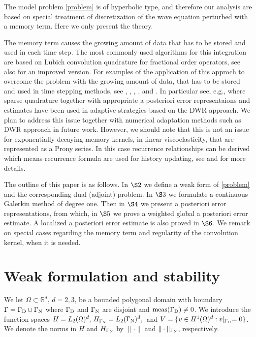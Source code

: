 \documentclass{amsart}
\numberwithin{equation}{section}
\theoremstyle{definition}
\begin{document}
The model problem \eqref{problem} is of hyperbolic type, and therefore 
our analysis are based on special treatment of discretization of the 
wave equation perturbed with a memory term. 
Here we only present the theory.

The memory term causes the growing amount 
of data that has to be stored and used in each time step. 
The most commonly used algorithms for this
integration are based on Lubich convolution quadrature \cite{Lubich} 
for fractional order
operators, see also \cite{LopezLubichSchadle} for an improved version. 
For examples of the application of this approch to overcome the problem 
with the growing amount of data, that has to be stored and used in time stepping 
methods, see \cite{Stig2}, \cite{Stig3}, \cite{Stig4}, \cite{LubichSloanThomee}, 
and \cite{McLeanThomeeWahlbin}. 
In particular see, e.g., \cite{Stig2} where sparse quadrature together with 
appropriate a posteriori error representaions and estimates have been 
used in adaptive strategies based on the DWR approach. 
We plan to address this issue together with numerical adaptation 
methods such as DWR approach in future work.  
However, we should note that this is not an issue for exponentially decaying 
memory kernels, in linear viscoelasticity, that are represented as a Prony series.  
In this case recurrence relationships can be derived which means recurrence formula 
are used for history updating, see \cite{KaramanouShawWarbyWhiteman2005} 
and \cite{ShawWhiteman} for more details. 

The outline of this paper is as follows. In $\S2$ we define
a weak form of \eqref{problem} and the corresponding
dual (adjoint) problem. 
In $\S3$ we formulate a continuous Galerkin method of degree 
one. 
Then in $\S4$ we present a posteriori error representations, from which,  
in $\S5$ we prove a weighted global a posteriori error estimate. 
A  localized a posteriori error estimate is also proved in $\S6$. 
We remark on special cases regarding the memory term and 
regularity of the convolution kernel, when it is needed.

\section{{\bf Weak formulation and stability}}
We let $\Omega \subset\mathbb{R}^d, \, d=2,3$, be a bounded polygonal domain
with boundary $\Gamma=\Gamma_{\text D}\cup\Gamma_{\text N}$ where
$\Gamma_{\text D}$ and $\Gamma_{\text N}$ are
disjoint and $\operatorname{meas}(\Gamma_{\text D})\not=0$.
We introduce the function spaces
$H=L_2(\Omega)^d,\,H_{\Gamma_{\text N}}=L_2(\Gamma_{\text N})^d,\,$
and
$V=\{v\in H^1(\Omega)^d:v\!\!\mid_{\Gamma_{\text D}}=0\}$.
We denote the norms in $H$ and $H_{\Gamma_{\text N}}$ by
$\|\cdot\|$ and $\|\cdot\|_{\Gamma_{\text N}}$, respectively. 
\end{document}
